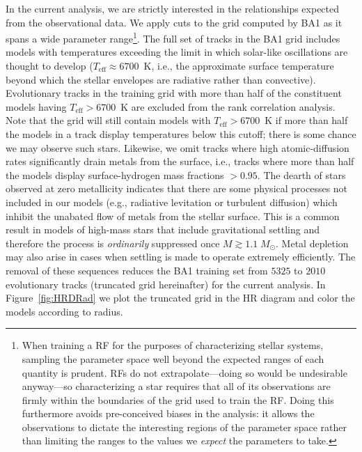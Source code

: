 In the current analysis, we are strictly interested in the relationships expected from the observational data. We apply cuts to the grid computed by BA1 as it spans a wide parameter range\footnote{When training a RF for the purposes of characterizing stellar systems,  sampling the parameter space well beyond the expected ranges of each quantity is prudent. RFs do not extrapolate---doing so would be undesirable anyway---so characterizing a star requires that all of its observations are firmly within the boundaries of the grid used to train the RF. Doing this furthermore avoids pre-conceived biases in the analysis: it allows the observations to dictate the interesting regions of the parameter space rather than limiting the ranges to the values we \emph{expect} the parameters to take.}. The full set of tracks in the BA1 grid includes models with temperatures exceeding the limit in which solar-like oscillations are thought to develop (${ T_{\text{eff}} \approx 6700}$~K, i.e., the approximate surface temperature beyond which the stellar envelopes are radiative rather than convective). 
Evolutionary tracks in the training grid with more than half of the constituent models having $T{_{\text{eff}} > 6700}$~K are excluded from the rank correlation analysis.
Note that the grid will still contain models with $T{_{\text{eff}} > 6700}$~K if more than half the models in a track display temperatures below this cutoff; there is some chance we may observe such stars. 
Likewise, we omit tracks where high atomic-diffusion rates significantly drain metals from the surface, i.e., tracks where more than half the models display surface-hydrogen mass fractions ${> 0.95}$. The dearth of stars observed at zero metallicity indicates that there are some physical processes not included in our models (e.g., radiative levitation or turbulent diffusion) which inhibit the unabated flow of metals from the stellar surface.
This is a common result in models of high-mass stars that include gravitational settling and therefore the process is \emph{ordinarily} suppressed once  ${M \gtrsim 1.1\;M_{\odot}}$. Metal depletion may also arise in cases when settling is made to operate extremely efficiently. 
The removal of these sequences reduces the BA1 training set from $5325$ to $2010$ evolutionary tracks (truncated grid hereinafter) for the current analysis. 
In Figure~\ref{fig:HRDRad} we plot the truncated grid in the HR diagram and color the models according to radius.  



